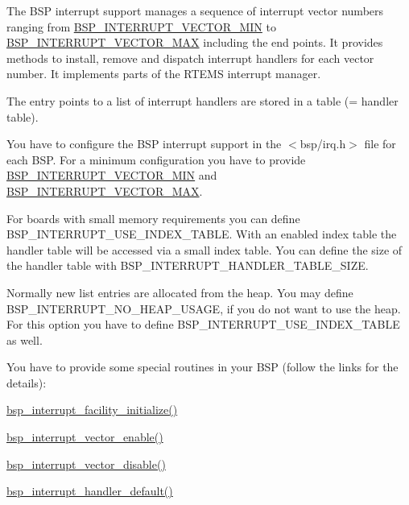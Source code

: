 The B\+SP interrupt support manages a sequence of interrupt vector numbers ranging from \mbox{\hyperlink{bsps_2or1k_2generic__or1k_2include_2bsp_2irq_8h_a64cbb02dfea4d6923abccaa0087d2a0d}{B\+S\+P\+\_\+\+I\+N\+T\+E\+R\+R\+U\+P\+T\+\_\+\+V\+E\+C\+T\+O\+R\+\_\+\+M\+IN}} to \mbox{\hyperlink{group__bsp__interrupt_gae4a2cdda5816a4c83c2fac0a49880c6e}{B\+S\+P\+\_\+\+I\+N\+T\+E\+R\+R\+U\+P\+T\+\_\+\+V\+E\+C\+T\+O\+R\+\_\+\+M\+AX}} including the end points. It provides methods to install, remove and dispatch interrupt handlers for each vector number. It implements parts of the R\+T\+E\+MS interrupt manager.

The entry points to a list of interrupt handlers are stored in a table (= handler table).

You have to configure the B\+SP interrupt support in the $<$bsp/irq.\+h$>$ file for each B\+SP. For a minimum configuration you have to provide \mbox{\hyperlink{bsps_2or1k_2generic__or1k_2include_2bsp_2irq_8h_a64cbb02dfea4d6923abccaa0087d2a0d}{B\+S\+P\+\_\+\+I\+N\+T\+E\+R\+R\+U\+P\+T\+\_\+\+V\+E\+C\+T\+O\+R\+\_\+\+M\+IN}} and \mbox{\hyperlink{group__bsp__interrupt_gae4a2cdda5816a4c83c2fac0a49880c6e}{B\+S\+P\+\_\+\+I\+N\+T\+E\+R\+R\+U\+P\+T\+\_\+\+V\+E\+C\+T\+O\+R\+\_\+\+M\+AX}}.

For boards with small memory requirements you can define B\+S\+P\+\_\+\+I\+N\+T\+E\+R\+R\+U\+P\+T\+\_\+\+U\+S\+E\+\_\+\+I\+N\+D\+E\+X\+\_\+\+T\+A\+B\+LE. With an enabled index table the handler table will be accessed via a small index table. You can define the size of the handler table with B\+S\+P\+\_\+\+I\+N\+T\+E\+R\+R\+U\+P\+T\+\_\+\+H\+A\+N\+D\+L\+E\+R\+\_\+\+T\+A\+B\+L\+E\+\_\+\+S\+I\+ZE.

Normally new list entries are allocated from the heap. You may define B\+S\+P\+\_\+\+I\+N\+T\+E\+R\+R\+U\+P\+T\+\_\+\+N\+O\+\_\+\+H\+E\+A\+P\+\_\+\+U\+S\+A\+GE, if you do not want to use the heap. For this option you have to define B\+S\+P\+\_\+\+I\+N\+T\+E\+R\+R\+U\+P\+T\+\_\+\+U\+S\+E\+\_\+\+I\+N\+D\+E\+X\+\_\+\+T\+A\+B\+LE as well.

You have to provide some special routines in your B\+SP (follow the links for the details)\+:
\begin{DoxyItemize}
\item \mbox{\hyperlink{group__bsp__interrupt_gab114a6e92b17b99bf52cf24d1125a9df}{bsp\+\_\+interrupt\+\_\+facility\+\_\+initialize()}}
\item \mbox{\hyperlink{group__bsp__interrupt_ga9968f1703b04b05f4f7e9fc5220da39a}{bsp\+\_\+interrupt\+\_\+vector\+\_\+enable()}}
\item \mbox{\hyperlink{group__bsp__interrupt_ga5428b914d0cb037e9b3f7cb2b758cabd}{bsp\+\_\+interrupt\+\_\+vector\+\_\+disable()}}
\item \mbox{\hyperlink{group__bsp__interrupt_ga3f1754ddeb359b41b89f90ad7fd81d58}{bsp\+\_\+interrupt\+\_\+handler\+\_\+default()}}
\end{DoxyItemize}

